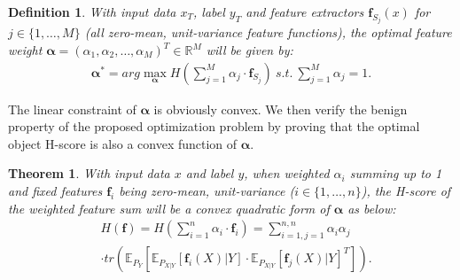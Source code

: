 \documentclass[letterpaper]{article} %
\newtheorem{theorem}{Theorem}
\newtheorem{definition}{Definition}
\begin{document}
\begin{definition}
    With input data $x_T$, label $y_T$ and feature extractors $\boldsymbol{f}_{S_j}(x)$ for $j \in \{1, \dots, M\}$ (all zero-mean, unit-variance feature functions), the optimal feature weight $\boldsymbol{\alpha} = (\alpha_1, \alpha_2, \dots, \alpha_M)^T \in \mathbb{R}^M$
    will be given by:
    \begin{equation}
        \begin{aligned}
        \boldsymbol{\alpha}^* = arg\max_{\boldsymbol{\alpha}}  H\left(\sum_{j=1}^M \alpha_{j} \cdot \boldsymbol{f}_{S_j}\right)  \
        s.t.\ \sum_{j=1}^M \alpha_j = 1 .
        \end{aligned}
    \label{tscore}
    \end{equation}
 \label{def:tscore}
\end{definition}

The linear constraint of $\boldsymbol{\alpha}$ is obviously convex. We then verify the benign property of the proposed optimization problem by proving that the optimal object H-score is also a convex function of $\boldsymbol{\alpha}$.


\begin{theorem}
      With input data $x$ and label $y$, when weighted $\alpha_i$ summing up to 1 and fixed features $\boldsymbol{f}_i$ being zero-mean, unit-variance ($i \in \{1, \dots, n\}$), the H-score of the weighted feature sum will be a convex quadratic form of $\boldsymbol{\alpha}$ as below:
    \begin{equation}
    \begin{aligned}
     &H(\boldsymbol{f}) = H\left(\sum_{i=1}^n \alpha_i \cdot \boldsymbol{f}_i\right) = \sum_{i=1, j=1}^{n,n}\alpha_i \alpha_j \\
     &\cdot tr(\mathbb{E}_{P_{Y}}[\mathbb{E}_{P_{X|Y}}[\boldsymbol{f}_i(X)|Y]\cdot \mathbb{E}_{P_{X|Y}}[\boldsymbol{f}_j(X)|Y]^T])   .
    \end{aligned}
    \end{equation}
    \label{theo:convex}
\end{theorem}
\end{document}
